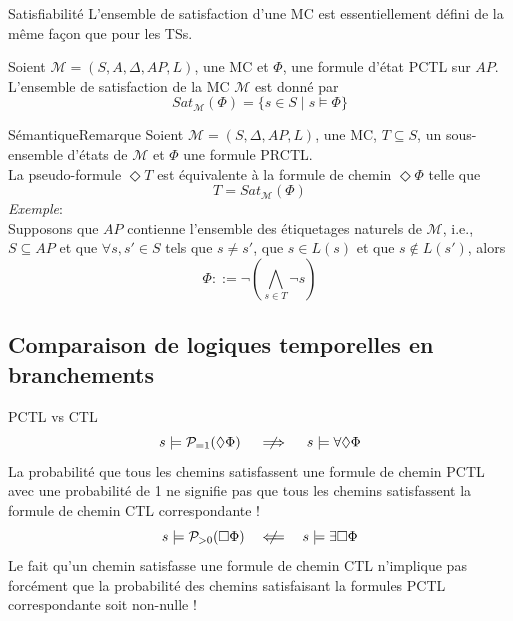 \documentclass[compress]{beamer}
\begin{document}
\begin{frame}{Satisfiabilité}
  L'ensemble de satisfaction d'une MC est essentiellement défini de la même façon que pour les TSs.
  \begin{definition}
    Soient $\mathcal{M} = (S, A, \Delta, AP, L)$, une MC et
    $\Phi$, une formule d'état PCTL sur $AP$. L'ensemble
    de satisfaction de la MC $\mathcal{M}$ est donné par
    \[
      Sat_\mathcal{M}(\Phi) = \{s \in S \; | \; s \models \Phi \}
    \]
  \end{definition}
\end{frame}

\begin{frame}{Sémantique}{Remarque}
  Soient $\mathcal{M} = (S, \Delta, AP, L)$, une MC, $T \subseteq S$, un sous-ensemble d'états de $\mathcal{M}$ et $\Phi$ une formule PRCTL. \\
  La pseudo-formule $\Diamond T$ est équivalente à la formule de chemin $\Diamond \Phi$ telle que
  \[
    T = Sat_\mathcal{M}(\Phi)
  \]
  \textit{\color{gray}Exemple}: \\
  Supposons que $AP$ contienne l'ensemble des étiquetages naturels de
  $\mathcal{M}$, i.e., $S \subseteq AP$ et que
  $\forall s, s' \in S$ tels que $s \neq s'$, que $s \in L(s)$ et que $s \not \in L(s')$, alors
  \[\Phi ::= \neg ( \bigwedge_{s \in T} \neg s )\]
\end{frame}

\subsection{Comparaison de logiques temporelles en branchements}
\begin{frame}{PCTL vs CTL}
\[
  s \models \mathcal{P}_{=1}(\Diamond \Phi) \quad  \centernot\implies \quad s \models \forall \Diamond \Phi
\]
\alert{La probabilité que tous les chemins satisfassent une formule de chemin PCTL avec une probabilité de 1 ne signifie pas que tous les chemins satisfassent la formule de chemin CTL correspondante !}
\[
  s \models \mathcal{P}_{>0}(\Box \Phi) \quad  \centernot\Longleftarrow \quad s \models \exists \Box \Phi
\]
\alert{Le fait qu'un chemin satisfasse une formule de chemin CTL n'implique pas forcément que la probabilité des chemins satisfaisant la formules PCTL correspondante soit non-nulle !}
\end{frame}
\end{document}
